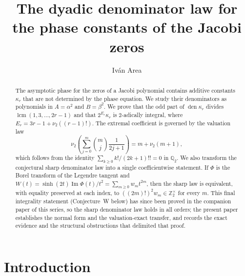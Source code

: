 \documentclass[12pt]{amsart}
\title{The dyadic denominator law for the phase constants of the Jacobi zeros}
\author[I. Area]{Iv\'an Area}
\theoremstyle{definition}
\theoremstyle{remark}
\DeclareMathOperator{\den}{den}
\begin{document}
\begin{abstract}
The asymptotic phase for the zeros of a Jacobi polynomial contains additive constants $\kappa_r$ that are not determined by the phase equation.  We study
their denominators as polynomials in $A=\alpha^2$ and $B=\beta^2$.  We prove that the odd part of $\den\kappa_r$ divides
$\operatorname{lcm}(1,3,\ldots,2r-1)$ and that $2^{E_r}\kappa_r$ is $2$-adically integral, where $E_r=3r-1+\nu_2((r-1)!)$.  The extremal coefficient is governed by the valuation law
\[
 \nu_2\!\left(\sum_{j=0}^{m}\binom mj\frac1{2j+1}\right)  =m+\nu_2(m+1),
\]
which follows from the identity $\sum_{k\ge0}k!/(2k+1)!!=0$ in $\mathbb Q_2$.  We also transform the conjectural sharp denominator law into a single coefficientwise statement. If $\Phi$ is the Borel transform of the Legendre tangent and $W(t)=\sinh(2t)\operatorname{Im}\Phi(t)/t^2=\sum_{m\ge0}w_mt^{2m}$, then the sharp law is equivalent, with equality preserved at each index, to $((2m)!)^2w_m\in\mathbb Z_2^\times$ for every $m$.  This final integrality
statement  (Conjecture~W below) has since been proved in the companion paper of this series, so the sharp denominator law holds in all orders; the present paper establishes the normal form and the valuation-exact transfer, and records the exact evidence and the structural obstructions that delimited that proof.
\end{abstract}

\maketitle

\section{Introduction}
\end{document}

